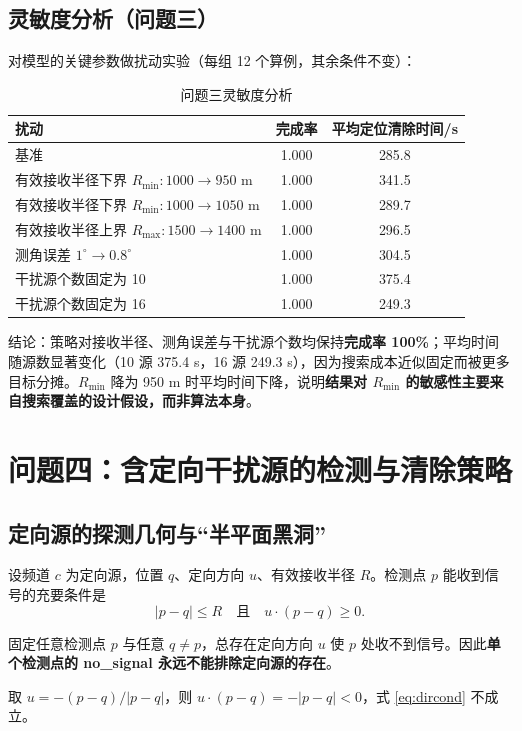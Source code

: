 \subsection{灵敏度分析（问题三）}

对模型的关键参数做扰动实验（每组 12 个算例，其余条件不变）：

\begin{table}[H]
\centering
\caption{问题三灵敏度分析}
\label{tab:q3sens}
\begin{tabular}{lcc}
\toprule
扰动 & 完成率 & 平均定位清除时间/s\\
\midrule
基准 & 1.000 & 285.8\\
有效接收半径下界 $R_{\min}:1000\to950$ m & 1.000 & 341.5\\
有效接收半径下界 $R_{\min}:1000\to1050$ m & 1.000 & 289.7\\
有效接收半径上界 $R_{\max}:1500\to1400$ m & 1.000 & 296.5\\
测角误差 $1^{\circ}\to0.8^{\circ}$ & 1.000 & 304.5\\
干扰源个数固定为 10 & 1.000 & 375.4\\
干扰源个数固定为 16 & 1.000 & 249.3\\
\bottomrule
\end{tabular}
\end{table}

结论：策略对接收半径、测角误差与干扰源个数均保持\textbf{完成率 100\%}；平均时间随源数显著变化（10 源 375.4 s，16 源 249.3 s），因为搜索成本近似固定而被更多目标分摊。$R_{\min}$ 降为 950 m 时平均时间下降，说明\textbf{结果对 $R_{\min}$ 的敏感性主要来自搜索覆盖的设计假设，而非算法本身}。

\section{问题四：含定向干扰源的检测与清除策略}

\subsection{定向源的探测几何与“半平面黑洞”}

设频道 $c$ 为定向源，位置 $q$、定向方向 $u$、有效接收半径 $R$。检测点 $p$ 能收到信号的充要条件是
\begin{equation}
|p-q|\le R\quad\text{且}\quad u\cdot(p-q)\ge0 .
\label{eq:dircond}
\end{equation}

\begin{proposition}[半平面黑洞]\label{prop:blackhole}
固定任意检测点 $p$ 与任意 $q\ne p$，总存在定向方向 $u$ 使 $p$ 处收不到信号。因此\textbf{单个检测点的 no\_signal 永远不能排除定向源的存在}。
\end{proposition}
\begin{pf}
取 $u=-(p-q)/|p-q|$，则 $u\cdot(p-q)=-|p-q|<0$，式 \eqref{eq:dircond} 不成立。
\end{pf}

